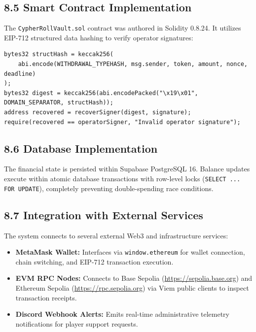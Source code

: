 \subsection*{8.5 Smart Contract Implementation}
The \texttt{CypherRollVault.sol} contract was authored in Solidity 0.8.24. It utilizes EIP-712 structured data hashing to verify operator signatures:
\begin{lstlisting}[language=Solidity,caption={EIP-712 Withdrawal Verification in CypherRollVault.sol}]
bytes32 structHash = keccak256(
    abi.encode(WITHDRAWAL_TYPEHASH, msg.sender, token, amount, nonce, deadline)
);
bytes32 digest = keccak256(abi.encodePacked("\x19\x01", DOMAIN_SEPARATOR, structHash));
address recovered = recoverSigner(digest, signature);
require(recovered == operatorSigner, "Invalid operator signature");
\end{lstlisting}

\subsection*{8.6 Database Implementation}
The financial state is persisted within Supabase PostgreSQL 16. Balance updates execute within atomic database transactions with row-level locks (\texttt{SELECT ... FOR UPDATE}), completely preventing double-spending race conditions.

\subsection*{8.7 Integration with External Services}
The system connects to several external Web3 and infrastructure services:
\begin{itemize}[leftmargin=1.5em]
    \item \textbf{MetaMask Wallet:} Interfaces via \texttt{window.ethereum} for wallet connection, chain switching, and EIP-712 transaction execution.
    \item \textbf{EVM RPC Nodes:} Connects to Base Sepolia (\url{https://sepolia.base.org}) and Ethereum Sepolia (\url{https://rpc.sepolia.org}) via Viem public clients to inspect transaction receipts.
    \item \textbf{Discord Webhook Alerts:} Emits real-time administrative telemetry notifications for player support requests.
\end{itemize}


